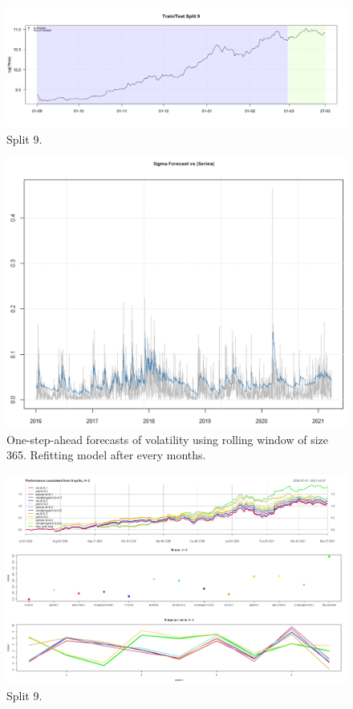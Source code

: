 \documentclass[
]{article}
\begin{document}
\begin{figure}

{\centering \includegraphics[width=0.9\linewidth]{images/splitplots/price9} 

}

\caption{Split 9.}\label{fig:price9}
\end{figure}

\begin{figure}

{\centering \includegraphics[width=0.9\linewidth]{images/GARCH/vola_forecasts} 

}

\caption{One-step-ahead forecasts of volatility using rolling window of size 365. Refitting model after every months.}\label{fig:vola_forecasts}
\end{figure}

\begin{figure}

{\centering \includegraphics[width=0.9\linewidth]{images/xailpd/lambda_2_with0_5/all} 

}

\caption{Split 9.}\label{fig:all2_05}
\end{figure}
\end{document}
